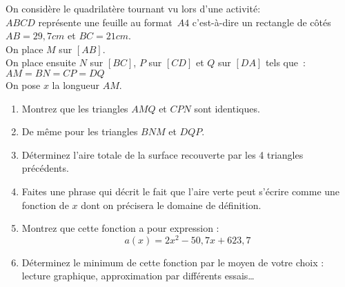 \exercice On considère le quadrilatère tournant vu lors d'une activité:\\[1em] \noindent
$ABCD$ représente une feuille au format~$A4$ c'est-à-dire un rectangle de côtés $AB = 29,7cm$ et $BC = 21cm$.\\
On place $M$ sur $[AB]$.\\
On place ensuite $N$ sur $[BC]$, $P$ sur $[CD]$ et $Q$ sur $[DA]$ tels que~:\\ $AM = BN = CP = DQ$\\[1em]
On pose $x$ la longueur $AM$.
\begin{center}
	
\end{center}

\begin{enumerate}
	\item Montrez que les triangles $AMQ$ et $CPN$ sont identiques.
	\item De même pour les triangles $BNM$ et $DQP$.
	\item Déterminez l'aire totale de la surface recouverte par les 4 triangles précédents.
	\item Faites une phrase qui décrit le fait que l'aire verte peut s'écrire comme une fonction de $x$ dont on précisera le domaine de définition.
	\item Montrez que cette fonction a pour expression : \[a(x) = 2x^2 - 50,7x + 623,7\]
	\item Déterminez le minimum de cette fonction par le moyen de votre choix : lecture graphique, approximation par différents essais\ldots
\end{enumerate}